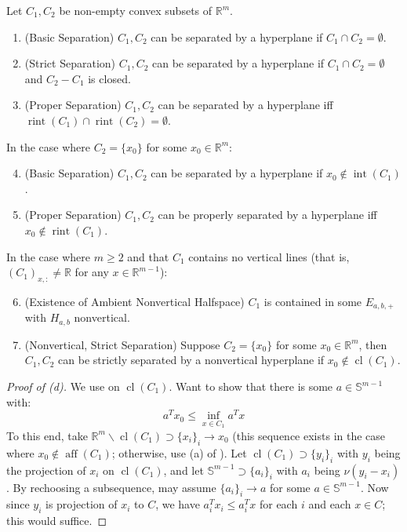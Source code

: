 \begin{prop}\label{prop:015-hyperplane-sep}
	Let $C_1,C_2$ be non-empty convex subsets of $\mathbb{R}^m$.
	\begin{enumerate}[label=(\alph*)]
		\item (Basic Separation) $C_1,C_2$ can be separated by a hyperplane if $C_1\cap C_2=\emptyset$.
		\item (Strict Separation) $C_1,C_2$ can be separated by a hyperplane if $C_1\cap C_2=\emptyset$ and $C_2-C_1$ is closed.
		\item (Proper Separation) $C_1,C_2$ can be separated by a hyperplane iff $\operatorname{rint}(C_1)\cap \operatorname{rint}(C_2)=\emptyset$.
	\end{enumerate}
	In the case where $C_2=\{x_0\}$ for some $x_0\in \mathbb{R}^m$:
	\begin{enumerate}[label=(\alph*)]
		\setcounter{enumi}{3}
		\item (Basic Separation) $C_1,C_2$ can be separated by a hyperplane if $x_0\notin \operatorname{int}(C_1)$.
		\item (Proper Separation) $C_1,C_2$ can be properly separated by a hyperplane iff $x_0\notin \operatorname{rint}(C_1)$.
	\end{enumerate}
	In the case where $m\geq 2$ and that $C_1$ contains no vertical lines (that is, $(C_{1})_{x,:}\neq \mathbb{R}$ for any $x\in \mathbb{R}^{m-1}$):
	\begin{enumerate}[label=(\alph*)]
		\setcounter{enumi}{5}
		\item (Existence of Ambient Nonvertical Halfspace) $C_1$ is contained in some $E_{a,b,+}$ with $H_{a,b}$ nonvertical.
		\item (Nonvertical, Strict Separation) Suppose $C_2=\{x_0\}$ for some $x_0\in \mathbb{R}^m$, then $C_1,C_2$ can be strictly separated by a nonvertical hyperplane if $x_0\notin \operatorname{cl}(C_1)$.
	\end{enumerate}
\end{prop}

\begin{proof}[Proof of (d)]
	We use  on $\operatorname{cl}(C_1)$. Want to show that there is some $a\in \mathbb{S}^{m-1}$ with:
	\[
		a^Tx_0\leq \underset{x\in C_1}{\operatorname{inf}}a^Tx
	\]
	To this end, take $\mathbb{R}^m\smallsetminus \operatorname{cl}(C_1)\supset \{x_i\}_i\to x_0$ (this sequence exists in the case where $x_0\notin \operatorname{aff}(C_1)$; otherwise, use (a) of ). Let $\operatorname{cl}(C_1)\supset\{y_i\}_i$ with $y_i$ being the projection of $x_i$ on $\operatorname{cl}(C_1)$, and let $\mathbb{S}^{m-1}\supset \{a_i\}_i$ with $a_i$ being $\nu(y_i-x_i)$. By rechoosing a subsequence, may assume $\{a_i\}_i\to a$ for some $a\in \mathbb{S}^{m-1}$. Now since $y_i$ is projection of $x_i$ to $C$, we have $a_i^Tx_i\leq a_i^Tx$ for each $i$ and each $x\in C$; this would suffice.
\end{proof}

